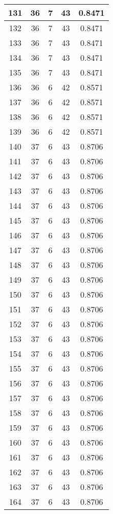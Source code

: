 \documentclass[letterpaper, 12pt]{article}
\begin{document}
\begin{longtable}{|c|c|c|c|c|}
\hline
131 & 36 & 7 & 43 & 0.8471 \\
\hline
132 & 36 & 7 & 43 & 0.8471 \\
\hline
133 & 36 & 7 & 43 & 0.8471 \\
\hline
134 & 36 & 7 & 43 & 0.8471 \\
\hline
135 & 36 & 7 & 43 & 0.8471 \\
\hline
136 & 36 & 6 & 42 & 0.8571 \\
\hline
137 & 36 & 6 & 42 & 0.8571 \\
\hline
138 & 36 & 6 & 42 & 0.8571 \\
\hline
139 & 36 & 6 & 42 & 0.8571 \\
\hline
140 & 37 & 6 & 43 & 0.8706 \\
\hline
141 & 37 & 6 & 43 & 0.8706 \\
\hline
142 & 37 & 6 & 43 & 0.8706 \\
\hline
143 & 37 & 6 & 43 & 0.8706 \\
\hline
144 & 37 & 6 & 43 & 0.8706 \\
\hline
145 & 37 & 6 & 43 & 0.8706 \\
\hline
146 & 37 & 6 & 43 & 0.8706 \\
\hline
147 & 37 & 6 & 43 & 0.8706 \\
\hline
148 & 37 & 6 & 43 & 0.8706 \\
\hline
149 & 37 & 6 & 43 & 0.8706 \\
\hline
150 & 37 & 6 & 43 & 0.8706 \\
\hline
151 & 37 & 6 & 43 & 0.8706 \\
\hline
152 & 37 & 6 & 43 & 0.8706 \\
\hline
153 & 37 & 6 & 43 & 0.8706 \\
\hline
154 & 37 & 6 & 43 & 0.8706 \\
\hline
155 & 37 & 6 & 43 & 0.8706 \\
\hline
156 & 37 & 6 & 43 & 0.8706 \\
\hline
157 & 37 & 6 & 43 & 0.8706 \\
\hline
158 & 37 & 6 & 43 & 0.8706 \\
\hline
159 & 37 & 6 & 43 & 0.8706 \\
\hline
160 & 37 & 6 & 43 & 0.8706 \\
\hline
161 & 37 & 6 & 43 & 0.8706 \\
\hline
162 & 37 & 6 & 43 & 0.8706 \\
\hline
163 & 37 & 6 & 43 & 0.8706 \\
\hline
164 & 37 & 6 & 43 & 0.8706 \\

\end{longtable}
\end{document}
